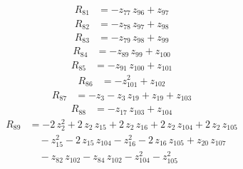 \begin{equation*}\begin{aligned}
R_{81}&=-z_{77}\,z_{96} +z_{97}
\end{aligned}\end{equation*}
\begin{equation*}\begin{aligned}
R_{82}&=-z_{78}\,z_{97} +z_{98}
\end{aligned}\end{equation*}
\begin{equation*}\begin{aligned}
R_{83}&=-z_{79}\,z_{98} +z_{99}
\end{aligned}\end{equation*}
\begin{equation*}\begin{aligned}
R_{84}&=-z_{89}\,z_{99} +z_{100}
\end{aligned}\end{equation*}
\begin{equation*}\begin{aligned}
R_{85}&=-z_{91}\,z_{100} +z_{101}
\end{aligned}\end{equation*}
\begin{equation*}\begin{aligned}
R_{86}&=-z_{101}^{2} +z_{102}
\end{aligned}\end{equation*}
\begin{equation*}\begin{aligned}
R_{87}&=-z_{3} -z_{3}\,z_{19} +z_{19} +z_{103}
\end{aligned}\end{equation*}
\begin{equation*}\begin{aligned}
R_{88}&=-z_{17}\,z_{103} +z_{104}
\end{aligned}\end{equation*}
\begin{equation*}\begin{aligned}
R_{89}&=-2\,z_{2}^{2} +2\,z_{2}\,z_{15} +2\,z_{2}\,z_{16} +2\,z_{2}\,z_{104} +2\,z_{2}\,z_{105} \\
&\quad -z_{15}^{2} -2\,z_{15}\,z_{104} -z_{16}^{2} -2\,z_{16}\,z_{105} +z_{20}\,z_{107} \\
&\quad -z_{82}\,z_{102} -z_{84}\,z_{102} -z_{104}^{2} -z_{105}^{2}
\end{aligned}\end{equation*}
